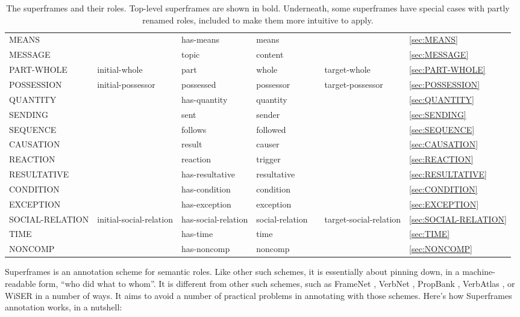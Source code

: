 \documentclass[a4paper]{article}
\newcommand{\fr}[1]{\textsf{#1}}
\newcommand{\rl}[1]{\textsf{#1}}
\newcommand{\boro}{\RowStyle{\bfseries}}
\begin{document}
\begin{table}
{\begin{NiceTabular}{lllllll}
            \boro\fr{MEANS} & & \rl{has-means} & \rl{means} & & & \ref{sec:MEANS} \\
            \boro\fr{MESSAGE} & & \rl{topic} & \rl{content} & & & \ref{sec:MESSAGE} \\
            \boro\fr{PART-WHOLE} & \rl{initial-whole} & \rl{part} & \rl{whole} & & \rl{target-whole} & \ref{sec:PART-WHOLE} \\
            \boro\fr{POSSESSION} & \rl{initial-possessor} & \rl{possessed} & \rl{possessor} & & \rl{target-possessor} & \ref{sec:POSSESSION} \\
            \boro\fr{QUANTITY} & & \rl{has-quantity} & \rl{quantity} & & & \ref{sec:QUANTITY} \\
            \boro\fr{SENDING} & & \rl{sent} & \rl{sender} & & & \ref{sec:SENDING} \\
            \boro\fr{SEQUENCE} & & \rl{follows} & \rl{followed} & & & \ref{sec:SEQUENCE} \\
            \fr{CAUSATION} & & \rl{result} & \rl{causer} & & & \ref{sec:CAUSATION} \\
            \fr{REACTION} & & \rl{reaction} & \rl{trigger} & & & \ref{sec:REACTION} \\
            \fr{RESULTATIVE} & & \rl{has-resultative} & \rl{resultative} & & & \ref{sec:RESULTATIVE} \\
            \fr{CONDITION} & & \rl{has-condition} & \rl{condition} & & & \ref{sec:CONDITION} \\
            \fr{EXCEPTION} & & \rl{has-exception} & \rl{exception} & & & \ref{sec:EXCEPTION} \\
            \boro\fr{SOCIAL-RELATION} & \rl{initial-social-relation} & \rl{has-social-relation} & \rl{social-relation} & & \rl{target-social-relation} & \ref{sec:SOCIAL-RELATION} \\
            \boro\fr{TIME} & & \rl{has-time} & \rl{time} & & & \ref{sec:TIME} \\
            \midrule
            \boro\fr{NONCOMP} & & \rl{has-noncomp} & \rl{noncomp} & & & \ref{sec:NONCOMP} \\
            \bottomrule
        \end{NiceTabular}
    }
    \caption{The superframes and their roles. Top-level superframes are shown in bold. Underneath, some superframes have special cases with partly renamed roles, included to make them more intuitive to apply.}
    \label{tab:superframes}
\end{table}

Superframes is an annotation scheme for semantic roles. Like other such
schemes, it is essentially about pinning down, in a machine-readable form,
``who did what to whom''. It is different from other such schemes, such as
FrameNet \citep{baker-etal-1998-berkeley}, VerbNet
\citep{kipper-schuler-2005-verbnet}, PropBank
\citep{palmer-etal-2005-proposition}, VerbAtlas
\citep{di-fabio-etal-2019-verbatlas}, or WiSER \citep{feng-etal-2022-widely} in
a number of ways. It aims to avoid a number of practical problems in annotating
with those schemes. Here's how Superframes annotation works, in a nutshell:
\end{document}
